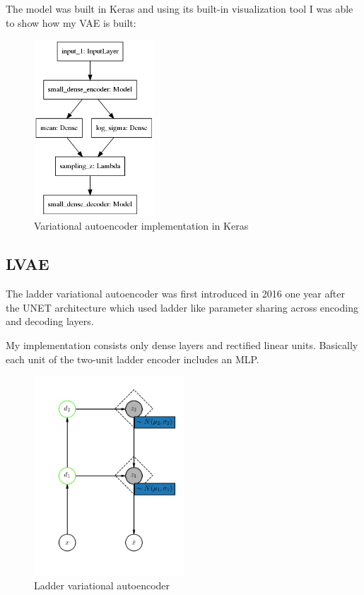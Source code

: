 \documentclass[11pt, english]{article}
\begin{document}
\par The model was built in Keras \cite{chollet2015keras} and using its built-in visualization tool I was able to show how my VAE is built:

\begin{figure}[H]
    \centering
    \includegraphics[width=0.4\textwidth]{vae_keras.png}
    \caption{Variational autoencoder implementation in Keras}
\end{figure}

\subsection{LVAE}

\par The ladder variational autoencoder was first introduced in 2016 \cite{sonderby2016ladder} one year after the UNET \cite{ronneberger2015u} architecture which used ladder like parameter sharing across encoding and decoding layers.

\par My implementation consists only dense layers and rectified linear units. Basically each unit of the two-unit ladder encoder includes an MLP. 

\begin{figure}[H]
    \centering
    \includegraphics[width=0.5\textwidth]{lvae.png}
    \caption{Ladder variational autoencoder}
\end{figure}
\end{document}
